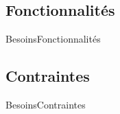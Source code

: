 \subsection{Fonctionnalités}
\begin{frame}{Besoins}{Fonctionnalités}

\end{frame}

\subsection{Contraintes}
\begin{frame}{Besoins}{Contraintes}

\end{frame}